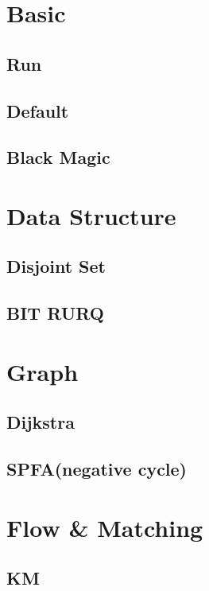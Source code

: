 \section{Basic}
    \subsection{Run}
        
    \subsection{Default}
        
    \subsection{Black Magic}
        
    
\section{Data Structure}
    \subsection{Disjoint Set}
        
    \subsection{BIT RURQ}
        

\section{Graph}
    \subsection{Dijkstra}
        
    \subsection{SPFA(negative cycle)}
        

\section{Flow \& Matching}
    \subsection{KM}
        

